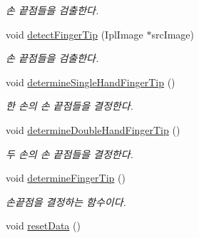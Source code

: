 \begin{DoxyCompactItemize}
\begin{DoxyCompactList}\small\item\em 손 끝점들을 검출한다. \end{DoxyCompactList}\item 
\hypertarget{class_fk_finger_tip_detector_a5f4a3e8d99d6cb116922a3aafc25854c}{}void \hyperlink{class_fk_finger_tip_detector_a5f4a3e8d99d6cb116922a3aafc25854c}{detect\+Finger\+Tip} (Ipl\+Image $\ast$src\+Image)\label{class_fk_finger_tip_detector_a5f4a3e8d99d6cb116922a3aafc25854c}

\begin{DoxyCompactList}\small\item\em 손 끝점들을 검출한다. \end{DoxyCompactList}\item 
\hypertarget{class_fk_finger_tip_detector_affbfbb957c0fe8f0bc9c705424772429}{}void \hyperlink{class_fk_finger_tip_detector_affbfbb957c0fe8f0bc9c705424772429}{determine\+Single\+Hand\+Finger\+Tip} ()\label{class_fk_finger_tip_detector_affbfbb957c0fe8f0bc9c705424772429}

\begin{DoxyCompactList}\small\item\em 한 손의 손 끝점들을 결정한다. \end{DoxyCompactList}\item 
\hypertarget{class_fk_finger_tip_detector_ae9a73198c19943f1f58f8e111959a8b5}{}void \hyperlink{class_fk_finger_tip_detector_ae9a73198c19943f1f58f8e111959a8b5}{determine\+Double\+Hand\+Finger\+Tip} ()\label{class_fk_finger_tip_detector_ae9a73198c19943f1f58f8e111959a8b5}

\begin{DoxyCompactList}\small\item\em 두 손의 손 끝점들을 결정한다. \end{DoxyCompactList}\item 
\hypertarget{class_fk_finger_tip_detector_ad05e6a82edfcca48212882a2238b1d92}{}void \hyperlink{class_fk_finger_tip_detector_ad05e6a82edfcca48212882a2238b1d92}{determine\+Finger\+Tip} ()\label{class_fk_finger_tip_detector_ad05e6a82edfcca48212882a2238b1d92}

\begin{DoxyCompactList}\small\item\em 손끝점을 결정하는 함수이다. \end{DoxyCompactList}\item 
\hypertarget{class_fk_finger_tip_detector_a697bb5801c3bd7d0a5d454aac0c10aa2}{}void \hyperlink{class_fk_finger_tip_detector_a697bb5801c3bd7d0a5d454aac0c10aa2}{reset\+Data} ()\label{class_fk_finger_tip_detector_a697bb5801c3bd7d0a5d454aac0c10aa2}


\end{DoxyCompactItemize}
